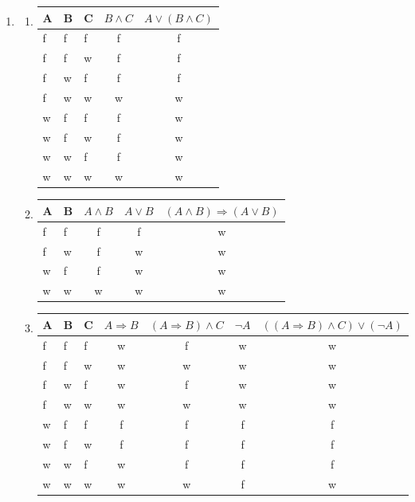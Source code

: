 \documentclass[a4paper]{article}
\begin{document}
\begin{enumerate}
		\item
		\begin{enumerate}
			\item
				\begin{tabular}{|l|l|l|c|c|}
					\firsthline
					A & B & C & $ B \land C $ & $ A  \lor (B \land C)$ \\
					\hline
					f & f & f & f & f \\
					f & f & w & f & f \\
					f & w & f & f & f \\
					f & w & w & w & w \\
					w & f & f & f & w \\
					w & f & w & f & w \\
					w & w & f & f & w \\
					w & w & w & w & w \\
					\hline
				\end{tabular}
			\item
			\begin{tabular}{|l|l|c|c|c|}
				\firsthline
				A & B & $A \land B$ & $A \lor B$ & $(A \land B) \Rightarrow (A \lor B)$ \\
				\hline
				f & f & f & f & w \\
				f & w & f & w & w \\
				w & f & f & w & w \\
				w & w & w & w & w \\
				\hline
			\end{tabular}
			
			\item
			\begin{tabular}{|l|l|l|c|c|c|c|}
				\firsthline
				A & B & C & $A \Rightarrow B$ & $(A \Rightarrow B) \land C$ & $ \lnot A$ & $((A \Rightarrow B) \land C) \lor (\lnot A)$ \\
				\hline
				f & f & f & w & f & w & w \\
				f & f & w & w & w & w & w \\
				f & w & f & w & f & w & w \\
				f & w & w & w & w & w & w \\
				w & f & f & f & f & f & f \\
				w & f & w & f & f & f & f \\
				w & w & f & w & f & f & f \\
				w & w & w & w & w & f & w \\
				\hline
			\end{tabular}
		\end{enumerate}
			

\end{enumerate}
\end{document}
